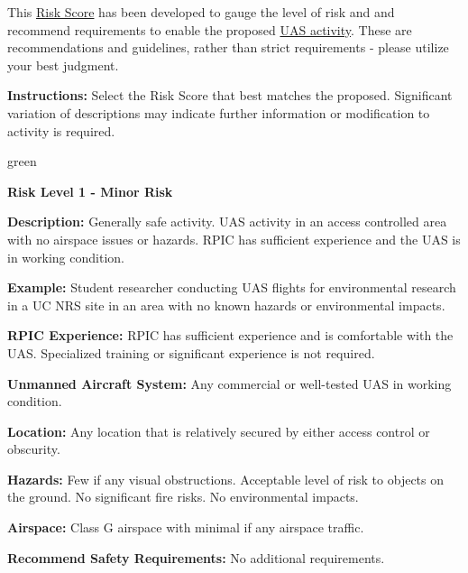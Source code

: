 \documentclass[
]{book}
\newenvironment{content}{\hrulefill}{}{}
\newenvironment{titleB}{}{}
\begin{document}
This \protect\hyperlink{riskscore}{Risk Score} has been developed to gauge the level of risk and and recommend requirements to enable the proposed \protect\hyperlink{UASactivity}{UAS activity}. These are recommendations and guidelines, rather than strict requirements - please utilize your best judgment.

\textbf{Instructions:} Select the Risk Score that best matches the proposed. Significant variation of descriptions may indicate further information or modification to activity is required.

\begin{content-box}{green}

\begin{titleB}

\textbf{Risk Level 1 - Minor Risk}

\end{titleB}

\begin{content}

\textbf{Description:} Generally safe activity. UAS activity in an access controlled area with no airspace issues or hazards. RPIC has sufficient experience and the UAS is in working condition.

\textbf{Example:} Student researcher conducting UAS flights for environmental research in a UC NRS site in an area with no known hazards or environmental impacts.

\textbf{RPIC Experience:} RPIC has sufficient experience and is comfortable with the UAS. Specialized training or significant experience is not required.

\textbf{Unmanned Aircraft System:} Any commercial or well-tested UAS in working condition.

\textbf{Location:} Any location that is relatively secured by either access control or obscurity.

\textbf{Hazards:} Few if any visual obstructions. Acceptable level of risk to objects on the ground. No significant fire risks. No environmental impacts.

\textbf{Airspace:} Class G airspace with minimal if any airspace traffic.

\textbf{Recommend Safety Requirements:} No additional requirements.

\end{content}

\end{content-box}
\end{document}
